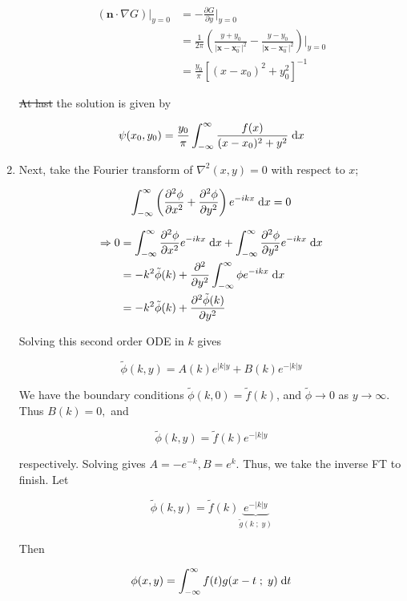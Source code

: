 \documentclass[a4paper]{article}
\begin{document}
\begin{enumerate}
	\begin{align*}
	(\mathbf{n} \cdot \nabla G )|_{y = 0} & = - \frac{\partial G }{\partial y} \Big|_{y = 0} \\
	& = \frac{1}{2\pi} \left(  \frac{y + y_{0}}{| \mathbf{x} - \mathbf{x}_{0}^{-} |^{2}} - \frac{y - y_{0}}{| \mathbf{x} - \mathbf{x}_{0}^{-} |^{2}} \right) \Big|_{y = 0} \\
	& = \frac{y_{0}}{\pi} [  (x - x_{0})^{2} + y_{0}^{2}   ]^{-1}
	\end{align*}
	
	\st{At last} the solution is given by
	
	\[ \psi(x_{0},y_{0}) = \frac{y_{0}}{\pi} \int_{-\infty}^{\infty} \frac{f(x)}{(x - x_{0})^{2} + y^{2} } \; \mathrm{d} x \]
	
	\item Next, take the Fourier transform of $ \nabla^{2}(x,y) = 0 $ with respect to $ x $;
	
	\[ \int_{-\infty}^{\infty} \left(  \frac{\partial^{2} \phi }{\partial x^{2}} + \frac{\partial^{2} \phi }{\partial y^{2}} \right) e^{-ikx} \; \mathrm{d} x = 0  \]
	
	\begin{align*}
	\Rightarrow 0 & = \int_{-\infty}^{\infty}  \frac{\partial^{2} \phi }{\partial x^{2}}  e^{-ikx} \; \mathrm{d} x  + \int_{-\infty}^{\infty} \frac{\partial^{2} \phi }{\partial y^{2}} e^{-ikx} \; \mathrm{d} x\\
	& = - k^{2} \tilde{\phi}(k) + \frac{\partial^{2} }{\partial y^{2}} \int_{-\infty}^{\infty}  \phi e^{- i k x} \; \mathrm{d} x\\
	& = - k^{2} \tilde{\phi}(k) +  \frac{\partial^{2} \tilde{\phi}(k) }{\partial y^{2}}
	\end{align*}
	
	Solving this second order ODE in $ k $ gives
	
	\[ \tilde{\phi}(k,y) = A(k) e^{| k |y} + B(k) e^{-| k |y}  \]
	
	We have the boundary conditions $ \tilde{\phi}(k,0) = \tilde{f}(k) $, and $ \tilde{\phi} \to 0 $ as $ y \to \infty $. Thus $ B(k) = 0, $ and

	\[ \tilde{\phi}(k,y) = \tilde{f}(k) e^{-| k |y}  \]
	
	respectively. Solving gives $  A = - e^{-k}, B = e^{k} $. Thus, we take the inverse FT to finish. Let
	
	\[ \tilde{\phi}(k,y) = \tilde{f}(k) \underbrace{e^{-| k |y}}_{\tilde{g}(k \; ; \; y)} \]
	
	Then
	
	\[ \phi(x,y)  = \int_{-\infty}^{\infty} f(t) g( x - t \; ; \; y) \; \mathrm{d} t  \]
	

\end{enumerate}
\end{document}

